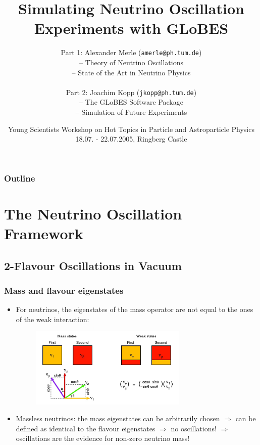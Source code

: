 \documentclass{beamer}
\title[Neutrino Oscillations and GLoBES]
      {Simulating Neutrino Oscillation Experiments with GLoBES}
\author[J. Kopp, A. Merle]
       {\parbox{9 cm}{Part 1: Alexander Merle (\texttt{amerle@ph.tum.de}) \\
                      -- Theory of Neutrino Oscillations       \\
                      -- State of the Art in Neutrino Physics  \\ \\
                      Part 2: Joachim Kopp (\texttt{jkopp@ph.tum.de})     \\
                      -- The GLoBES Software Package           \\
                      -- Simulation of Future Experiments}}
\institute[TUM]
          {TU M\"unchen, Lehrstuhl T30d f\"ur Theoretische Elementarteilchenphysik (Prof. Lindner)}
\date[21.07.2005]
     {Young Scientists Workshop on Hot Topics in Particle and Astroparticle Physics \\
      18.07. - 22.07.2005, Ringberg Castle}
\begin{document}
\begin{frame}
  \titlepage
\end{frame}


\begin{frame}
  \frametitle{Outline}
  \tableofcontents
\end{frame}


\section{The Neutrino Oscillation Framework}

\subsection{2-Flavour Oscillations in Vacuum}

\begin{frame}
  \frametitle{Mass and flavour eigenstates}

  \begin{itemize}
    \item For neutrinos, the eigenstates of the mass operator are not equal to
    the ones of the weak interaction:
    
   \begin{figure}
    \begin{center}
      \includegraphics[width=7.5cm]{fig/osc1.jpg}
    \end{center}
  \end{figure}
        
     \item  Massless neutrinos: the mass eigenstates can be arbitrarily chosen $\Rightarrow$ can be defined as identical to the flavour eigenstates $\Rightarrow$ no oscillations! $\Rightarrow$ oscillations are the evidence for non-zero neutrino mass!  

   \end{itemize}
\end{frame}
\end{document}

